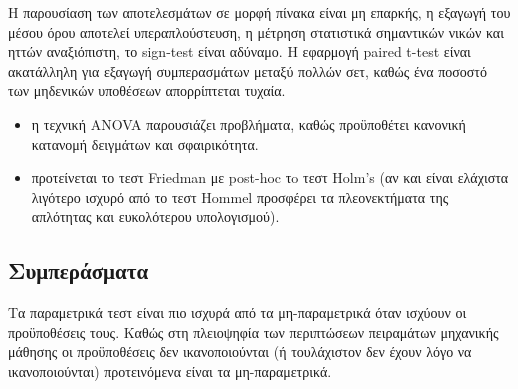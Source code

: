 \documentclass[]{article}
\numberwithin{equation}{section}		%
\numberwithin{figure}{section}			%
\numberwithin{table}{section}				%
\begin{document}
    Η παρουσίαση των αποτελεσμάτων σε μορφή πίνακα είναι μη επαρκής, η εξαγωγή του μέσου όρου αποτελεί υπεραπλούστευση, η μέτρηση στατιστικά σημαντικών νικών και ηττών αναξιόπιστη, το sign-test είναι αδύναμο. Η εφαρμογή paired t-test είναι ακατάλληλη για εξαγωγή συμπερασμάτων μεταξύ πολλών σετ, καθώς ένα ποσοστό των μηδενικών υποθέσεων απορρίπτεται τυχαία.  
    
    \begin{itemize}
    	\item η τεχνική ANOVA παρουσιάζει προβλήματα, καθώς προϋποθέτει κανονική κατανομή δειγμάτων και σφαιρικότητα.
    	\item προτείνεται το τεστ Friedman με post-hoc τo τεστ Holm's (αν και είναι ελάχιστα λιγότερο ισχυρό από το τεστ Hommel προσφέρει τα πλεονεκτήματα της απλότητας και ευκολότερου υπολογισμού).
    \end{itemize}
    
    \subsection{Συμπεράσματα}
    Τα παραμετρικά τεστ είναι πιο ισχυρά από τα μη-παραμετρικά όταν ισχύουν οι προϋποθέσεις τους. Καθώς στη πλειοψηφία των περιπτώσεων πειραμάτων μηχανικής μάθησης οι προϋποθέσεις δεν ικανοποιούνται (ή τουλάχιστον δεν έχουν λόγο να ικανοποιούνται) προτεινόμενα είναι τα μη-παραμετρικά.
    \printbibliography[title= Βιβλιογραφία]
\end{document}
